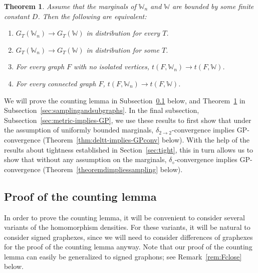 \documentclass{amsart}
\numberwithin{equation}{section}
\numberwithin{figure}{section}
\newtheorem{theorem}{Theorem}[section]
\theoremstyle{definition}
\theoremstyle{remark}
\newcommand{\cW}{\mathbb{W}}
\newcommand{\deltt}{\delta_{2\to 2}}
\def\delGP{\delta_\diamond}
\begin{document}
\begin{theorem} \label{theoremgraphexconveq}
Assume that the marginals of $\cW_n$ and $\cW$ are bounded by some finite
constant $D$. Then the following are equivalent:
\begin{enumerate}
\item $G_T(\cW_n)\rightarrow G_T(\cW)$ in distribution for every $T$. \label{graphexconvallT}
\item $G_T(\cW_n)\rightarrow G_T(\cW)$ in distribution for some $T$. \label{graphexconvoneT}
\item For every graph $F$ with no isolated vertices, $t(F,\cW_n) \rightarrow t(F,\cW)$. \label{graphexconvnoisol}
\item For every connected graph $F$, $t(F,\cW_n) \rightarrow t(F,\cW)$. \label{graphexconvconn}
\end{enumerate}
\end{theorem}

We will prove the counting lemma in Subsection~\ref{sec:counting} below, and
Theorem~\ref{theoremgraphexconveq} in
Subsection~\ref{sec:samplingandsubgraphs}. In the final subsection,
Subsection~\ref{sec:metric-implies-GP}, we use these results to first show
that under the assumption of uniformly bounded marginals,
$\deltt$-convergence implies GP-convergence
(Theorem~\ref{thm:deltt-implies-GPconv} below). With the help of the results
about tightness established in Section~\ref{sec:tight}, this in turn allows
us to show that without any assumption on the marginals, $\delGP$-convergence
implies GP-convergence (Theorem~\ref{theoremdimpliessampling} below).

\subsection{Proof of the counting lemma} \label{sec:counting}

In order to prove the counting lemma, it will be convenient to consider
several variants of the homomorphism densities. For these variants, it will
be natural to consider signed graphexes, since we will need to consider
differences of graphexes for the proof of the counting lemma anyway. Note
that our proof of the counting lemma can easily be generalized to signed
graphons; see Remark~\ref{rem:Fclose} below.
\end{document}
